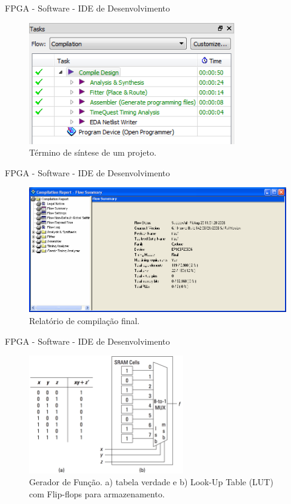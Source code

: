 \documentclass[aspectratio=169]{beamer}
\begin{document}
	\begin{frame}{FPGA - Software - IDE de Desenvolvimento}
		\begin{figure}[p]
			\centering
			\includegraphics[width=0.8\textwidth]{img/fpga/software_quartus_compilation1.png}
			\caption{Término de síntese de um projeto.}
			\label{fig:alteraquartus_comp1}
		\end{figure}
	\end{frame}
	
	\begin{frame}{FPGA - Software - IDE de Desenvolvimento}
		\begin{figure}[p]
			\centering
			\includegraphics[width=1\textwidth]{img/fpga/software_quartus_compilation2.png}
			\caption{Relatório de compilação final.}
			\label{fig:alteraquartus_comp2}
		\end{figure}
	\end{frame}
	
	\begin{frame}{FPGA - Software - IDE de Desenvolvimento}
		\begin{figure}[p]
			\centering
			\includegraphics[width=0.6\textwidth]{img/fpga/funcao-geradora.png}
			\caption{Gerador de Função. a) tabela verdade e b) Look-Up Table (LUT) com Flip-flops para armazenamento.}
			\label{fig:funcao-geradora}
		\end{figure}
	\end{frame}
	
\end{document}
